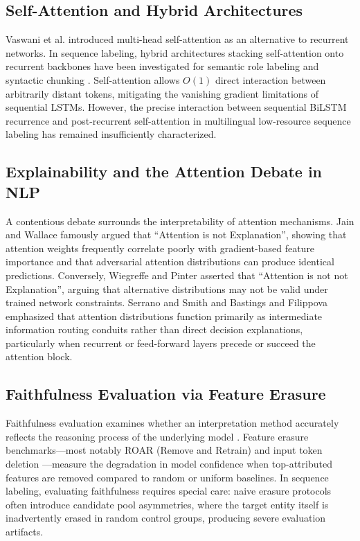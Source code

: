 \documentclass[default,iicol]{sn-jnl}
\begin{document}
\subsection{Self-Attention and Hybrid Architectures}
Vaswani et al. \cite{vaswani2017attention} introduced multi-head self-attention as an alternative to recurrent networks. In sequence labeling, hybrid architectures stacking self-attention onto recurrent backbones have been investigated for semantic role labeling and syntactic chunking \cite{strubell2018linguistically}. Self-attention allows $O(1)$ direct interaction between arbitrarily distant tokens, mitigating the vanishing gradient limitations of sequential LSTMs. However, the precise interaction between sequential BiLSTM recurrence and post-recurrent self-attention in multilingual low-resource sequence labeling has remained insufficiently characterized.

\subsection{Explainability and the Attention Debate in NLP}
A contentious debate surrounds the interpretability of attention mechanisms. Jain and Wallace \cite{jain2019attention} famously argued that ``Attention is not Explanation'', showing that attention weights frequently correlate poorly with gradient-based feature importance and that adversarial attention distributions can produce identical predictions. Conversely, Wiegreffe and Pinter \cite{wiegreffe2019attention} asserted that ``Attention is not not Explanation'', arguing that alternative distributions may not be valid under trained network constraints. Serrano and Smith \cite{serrano2019attention} and Bastings and Filippova \cite{bastings2020elephant} emphasized that attention distributions function primarily as intermediate information routing conduits rather than direct decision explanations, particularly when recurrent or feed-forward layers precede or succeed the attention block.

\subsection{Faithfulness Evaluation via Feature Erasure}
Faithfulness evaluation examines whether an interpretation method accurately reflects the reasoning process of the underlying model \cite{jacovi2020towards}. Feature erasure benchmarks—most notably ROAR (Remove and Retrain) \cite{hooker2019benchmark} and input token deletion \cite{derose2021attention,atanasova2020diagnostic}—measure the degradation in model confidence when top-attributed features are removed compared to random or uniform baselines. In sequence labeling, evaluating faithfulness requires special care: naive erasure protocols often introduce candidate pool asymmetries, where the target entity itself is inadvertently erased in random control groups, producing severe evaluation artifacts.
\end{document}
